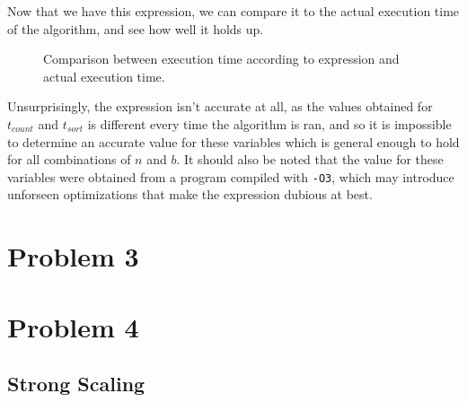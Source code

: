 \documentclass{article}
\begin{document}
Now that we have this expression, we can compare it to the actual execution time of the algorithm, and see how well it holds up. 


\testdata
\begin{figure}[H]
    \begin{center}
    \end{center}
    \caption{Comparison between execution time according to expression and actual execution time.}
\end{figure}

Unsurprisingly, the expression isn't accurate at all, as the values obtained for \( t_{count} \) and \( t_{sort} \) is different every time the algorithm is ran, and so it is impossible to determine an accurate value for these variables which is general enough to hold for all combinations of \( n \) and \( b \). It should also be noted that the value for these variables were obtained from a program compiled with \texttt{-O3}, which may introduce unforseen optimizations that make the expression dubious at best.


\section*{Problem 3}

\section*{Problem 4}

\subsection*{Strong Scaling}
\end{document}

